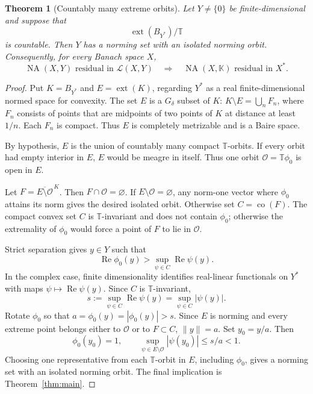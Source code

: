 \documentclass[11pt]{article}
\newtheorem{theorem}{Theorem}
\newcommand{\K}{\mathbb K}
\newcommand{\T}{\mathbb T}
\newcommand{\NA}{\operatorname{NA}}
\newcommand{\calL}{\mathcal L}
\newcommand{\ext}{\operatorname{ext}}
\newcommand{\co}{\operatorname{co}}
\newcommand{\norm}[1]{\lVert #1\rVert}
\begin{document}
\begin{theorem}[Countably many extreme orbits]\label{thm:countableorbits}
Let \(Y\neq\{0\}\) be finite-dimensional and suppose that
\[
 \ext(B_{Y^*})/\T
\]
is countable.  Then \(Y\) has a norming set with an isolated norming orbit.
Consequently, for every Banach space \(X\),
\[
 \NA(X,Y)\text{ residual in }\calL(X,Y)
 \quad\Longrightarrow\quad
 \NA(X,\K)\text{ residual in }X^*.
\]
\end{theorem}

\begin{proof}
Put \(K=B_{Y^*}\) and \(E=\ext(K)\), regarding \(Y^*\) as a real
finite-dimensional normed space for convexity.  The set \(E\) is a
\(G_\delta\) subset of \(K\): \(K\setminus E=\bigcup_n F_n\), where \(F_n\)
consists of points that are midpoints of two points of \(K\) at distance at
least \(1/n\).  Each \(F_n\) is compact.  Thus \(E\) is completely metrizable
and is a Baire space.

By hypothesis, \(E\) is the union of countably many compact \(\T\)-orbits.  If
every orbit had empty interior in \(E\), \(E\) would be meagre in itself.
Thus one orbit \(\mathcal O=\T\phi_0\) is open in \(E\).

Let \(F=\overline{E\setminus\mathcal O}^{\,K}\).  Then
\(F\cap\mathcal O=\varnothing\).  If \(E\setminus\mathcal O=\varnothing\), any
norm-one vector where \(\phi_0\) attains its norm gives the desired isolated
orbit.  Otherwise set \(C=\co(F)\).  The compact convex set \(C\) is
\(\T\)-invariant and does not contain \(\phi_0\); otherwise the extremality of
\(\phi_0\) would force a point of \(F\) to lie in \(\mathcal O\).

Strict separation gives \(y\in Y\) such that
\[
 \operatorname{Re}\phi_0(y)>
 \sup_{\psi\in C}\operatorname{Re}\psi(y).
\]
In the complex case, finite dimensionality identifies real-linear functionals
on \(Y^*\) with maps \(\psi\mapsto\operatorname{Re}\psi(y)\).  Since \(C\) is
\(\T\)-invariant,
\[
 s:=\sup_{\psi\in C}\operatorname{Re}\psi(y)
   =\sup_{\psi\in C}|\psi(y)|.
\]
Rotate \(\phi_0\) so that \(a=\phi_0(y)=|\phi_0(y)|>s\).  Since \(E\) is
norming and every extreme point belongs either to \(\mathcal O\) or to
\(F\subset C\), \(\norm y=a\).  Set \(y_0=y/a\).  Then
\[
 \phi_0(y_0)=1,\qquad
 \sup_{\psi\in E\setminus\mathcal O}|\psi(y_0)|\le s/a<1.
\]
Choosing one representative from each \(\T\)-orbit in \(E\), including
\(\phi_0\), gives a norming set with an isolated norming orbit.  The final
implication is Theorem~\ref{thm:main}.
\end{proof}
\end{document}
